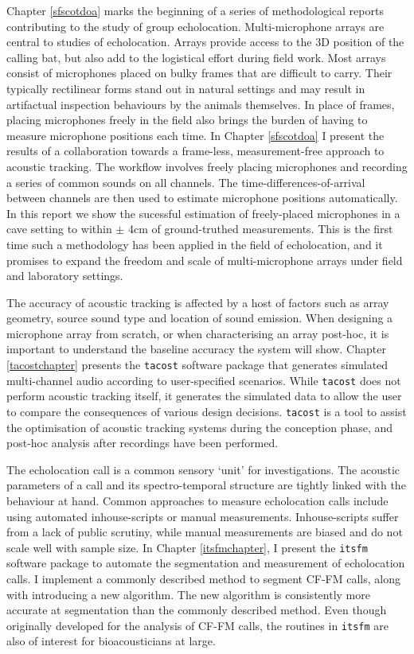 \documentclass[
]{book}
\begin{document}
Chapter \ref{sfscotdoa} marks the beginning of a series of methodological reports contributing to the study of group echolocation. Multi-microphone arrays are central to studies of echolocation. Arrays provide access to the 3D position of the calling bat, but also add to the logistical effort during field work. Most arrays consist of microphones placed on bulky frames that are difficult to carry. Their typically rectilinear forms stand out in natural settings and may result in artifactual inspection behaviours by the animals themselves. In place of frames, placing microphones freely in the field also brings the burden of having to measure microphone positions each time. In Chapter \ref{sfscotdoa} I present the results of a collaboration towards a frame-less, measurement-free approach to acoustic tracking. The workflow involves freely placing microphones and recording a series of common sounds on all channels. The time-differences-of-arrival between channels are then used to estimate microphone positions automatically. In this report we show the sucessful estimation of freely-placed microphones in a cave setting to within \(\pm\) 4cm of ground-truthed measurements. This is the first time such a methodology has been applied in the field of echolocation, and it promises to expand the freedom and scale of multi-microphone arrays under field and laboratory settings.

The accuracy of acoustic tracking is affected by a host of factors such as array geometry, source sound type and location of sound emission. When designing a microphone array from scratch, or when characterising an array post-hoc, it is important to understand the baseline accuracy the system will show. Chapter \ref{tacostchapter} presents the \texttt{tacost} software package that generates simulated multi-channel audio according to user-specified scenarios. While \texttt{tacost} does not perform acoustic tracking itself, it generates the simulated data to allow the user to compare the consequences of various design decisions. \texttt{tacost} is a tool to assist the optimisation of acoustic tracking systems during the conception phase, and post-hoc analysis after recordings have been performed.

The echolocation call is a common sensory `unit' for investigations. The acoustic parameters of a call and its spectro-temporal structure are tightly linked with the behaviour at hand. Common approaches to measure echolocation calls include using automated inhouse-scripts or manual measurements. Inhouse-scripts suffer from a lack of public scrutiny, while manual measurements are biased and do not scale well with sample size. In Chapter \ref{itsfmchapter}, I present the \texttt{itsfm} software package to automate the segmentation and measurement of echolocation calls. I implement a commonly described method to segment CF-FM calls, along with introducing a new algorithm. The new algorithm is consistently more accurate at segmentation than the commonly described method. Even though originally developed for the analysis of CF-FM calls, the routines in \texttt{itsfm} are also of interest for bioacousticians at large.
\end{document}
